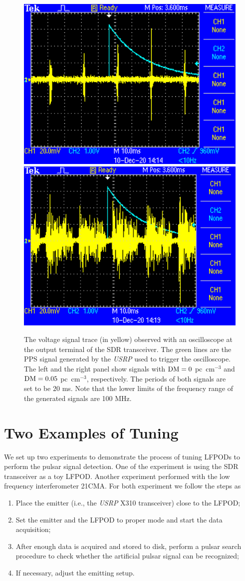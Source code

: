 \documentclass[fleqn,usenatbib]{mnras}
\begin{document}
\begin{figure}
    \centering
    \includegraphics[width=0.45\columnwidth]{dm_0_trace.eps}
    \includegraphics[width=0.45\columnwidth]{dm_0.05_trace.eps}
    \caption{The voltage signal trace (in yellow) observed with an oscilloscope at the output terminal of the SDR transceiver. The green lines are the PPS signal generated by the \textit{USRP} used to trigger the oscilloscope. The left and the right panel show signals with ${\rm DM}=0$ pc~cm$^{-3}$ and ${\rm DM}=0.05$ pc~cm$^{-3}$, respectively. The periods of both signals are set to be $20$ ms. Note that the lower limits of the frequency range of the generated signals are 100 MHz.}
    \label{fig:osc_trace}
\end{figure}

\section{Two Examples of Tuning}
We set up two experiments to demonstrate the process of tuning LFPODs to perform the pulsar signal detection. 
One of the experiment is using the SDR transceiver as a toy LFPOD.
Another experiment performed with the low frequency interferometer 21CMA.
For both experiment we follow the steps as
\begin{enumerate}
    \item Place the emitter (i.e., the \textit{USRP} X310 transceiver) close to the LFPOD;
    \item Set the emitter and the LFPOD to proper mode and start the data acquisition;
    \item After enough data is acquired and stored to disk, perform a pulsar search procedure to check whether the artificial pulsar signal can be recognized;
    \item If necessary, adjust the emitting setup.
\end{enumerate}
\end{document}
